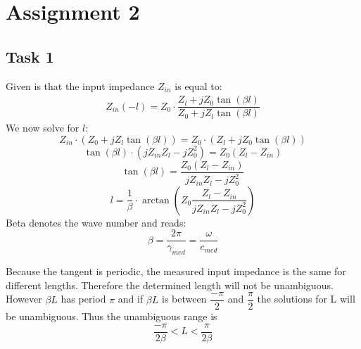 \documentclass[final]{scrreprt} %
\begin{document}

\chapter{Assignment 2}
\label{ch:sk5-ass2}
\section{Task 1}
Given is that the input impedance $Z_{in}$ is equal to:
\begin{align}
Z_{in}(-l) = Z_0 \cdot \dfrac{Z_l + jZ_0 \tan (\beta l)}{Z_0 + jZ_l \tan (\beta l)}
\end{align}
We now solve for $l$:
\begin{equation}
Z_{in} \cdot (Z_0 + jZ_l \tan (\beta l)) = Z_0 \cdot (Z_l + jZ_0 \tan (\beta l))
\end{equation}
\begin{equation}
\tan( \beta l) \cdot (jZ_{in} Z_l - jZ_0^2) = Z_0(Z_l - Z_{in})
\end{equation}
\begin{equation}
\tan (\beta l) = \dfrac{Z_0(Z_l - Z_{in})}{jZ_{in} Z_l - jZ_0^2}
\end{equation}
\begin{equation}
\label{eq:beta}
l = \dfrac{1}{\beta} \cdot \arctan (Z_0 \dfrac{Z_l - Z_{in}}{jZ_{in} Z_l - jZ_0^2})
\end{equation}
Beta denotes the wave number and reads:
\begin{equation}
\label{eq:range}
\beta = \dfrac{2 \pi}{\gamma_{med}} = \dfrac{\omega}{c_{med}}
\end{equation}

Because the tangent is periodic, the measured input impedance is the same for different lengths. 
Therefore the determined length will not be unambiguous. However $\beta L$ has period $\pi$ and if $\beta L$ is between $\dfrac{- \pi}{2}$ and $\dfrac{\pi}{2}$ the solutions for L will be unambiguous. 
Thus the unambiguous range is
\begin{equation}
\dfrac{- \pi}{2 \beta} < L < \dfrac{\pi}{2 \beta}
\end{equation}
\end{document}

